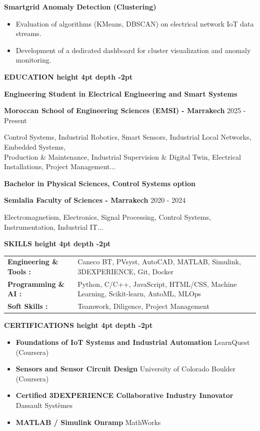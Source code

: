 \documentclass[10pt,a4paper]{altacv}
\renewcommand{\cvsection}[2][]{%
  \vspace{3pt}%
  {\color{heading}\LARGE\bfseries #2 \hspace{0.2em}\leaders\vrule height 4pt depth -2pt\hfill\mbox{}}\par\vspace{2pt}
}
\renewcommand{\cvevent}[4]{%
  {\large\bfseries\color{accent}#1\par}
  \smallskip\normalsize
  \ifstrequal{#2}{}{}{%
    \textbf{\color{emphasis}#2\ifstrequal{#4}{}{}{ - #4}}%
  }%
  \hfill
  \ifstrequal{#3}{}{}{{\small#3}}%
  \par\smallskip
}
\begin{document}
{\large\bfseries\color{accent} Smartgrid Anomaly Detection (Clustering)}\\[0.05cm]
\begin{itemize}
  \item Evaluation of algorithms (KMeans, DBSCAN) on electrical network IoT data streams.
  \item Development of a dedicated dashboard for cluster visualization and anomaly monitoring.
\end{itemize}

\cvsection{EDUCATION}
\cvevent{Engineering Student in Electrical Engineering and Smart Systems}{Moroccan School of Engineering Sciences (EMSI)}{2025 - Present}{Marrakech}
\small Control Systems, Industrial Robotics, Smart Sensors, Industrial Local Networks, Embedded Systems,\\
\small Production \& Maintenance, Industrial Supervision \& Digital Twin, Electrical Installations, Project Management...

\cvevent{Bachelor in Physical Sciences, Control Systems option}{Semlalia Faculty of Sciences}{2020 - 2024}{Marrakech}
\small Electromagnetism, Electronics, Signal Processing, Control Systems, Instrumentation, Industrial IT...

\cvsection{SKILLS}
\begin{tabular}{@{}ll@{}}
\textbf{Engineering \& Tools :} & Caneco BT, PVsyst, AutoCAD, MATLAB, Simulink, 3DEXPERIENCE, Git, Docker \\[2pt]
\textbf{Programming \& AI :} & Python, C/C++, JavaScript, HTML/CSS, Machine Learning, Scikit-learn, AutoML, MLOps \\[2pt]
\textbf{Soft Skills :} & Teamwork, Diligence, Project Management \\
\end{tabular}

\cvsection{CERTIFICATIONS}
\begin{itemize}[leftmargin=*, label=\textbullet, itemsep=2pt]
  \item \textbf{Foundations of IoT Systems and Industrial Automation} \hfill {\color{emphasis}LearnQuest (Coursera)}
  \item \textbf{Sensors and Sensor Circuit Design} \hfill {\color{emphasis}University of Colorado Boulder (Coursera)}
  \item \textbf{Certified 3DEXPERIENCE Collaborative Industry Innovator} \hfill {\color{emphasis}Dassault Systèmes}
  \item \textbf{MATLAB / Simulink Onramp} \hfill {\color{emphasis}MathWorks}
\end{itemize}
\end{document}
